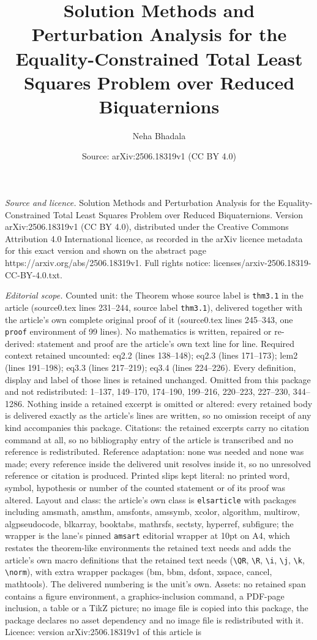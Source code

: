 \documentclass[10pt,a4paper]{amsart}
\title[Solution Methods and Perturbation Analysis for the Equality-]{Solution Methods and Perturbation Analysis for the Equality-Constrained Total Least Squares Problem over Reduced Biquaternions}
\author{Neha Bhadala}
\date{Source: arXiv:2506.18319v1 (CC BY 4.0)}
\begin{document}
\maketitle

\noindent\emph{Source and licence.} Solution Methods and Perturbation Analysis for the Equality-Constrained Total Least Squares Problem over Reduced Biquaternions. Version arXiv:2506.18319v1 (CC BY 4.0), distributed under the Creative Commons Attribution 4.0 International licence, as recorded in the arXiv licence metadata for this exact version and shown on the abstract page https://arxiv.org/abs/2506.18319v1. Full rights notice: licenses/arxiv-2506.18319-CC-BY-4.0.txt.\par\smallskip

\noindent\textit{Editorial scope.} Counted unit: the Theorem whose source label is \texttt{thm3.1} in the article (source0.tex lines 231--244, source label \texttt{thm3.1}), delivered together with the article's own complete original proof of it (source0.tex lines 245--343, one \texttt{proof} environment of 99 lines). No mathematics is written, repaired or re-derived: statement and proof are the article's own text line for line. Required context retained uncounted: eq2.2 (lines 138--148); eq2.3 (lines 171--173); lem2 (lines 191--198); eq3.3 (lines 217--219); eq3.4 (lines 224--226). Every definition, display and label of those lines is retained unchanged. Omitted from this package and not redistributed: 1--137, 149--170, 174--190, 199--216, 220--223, 227--230, 344--1286. Nothing inside a retained excerpt is omitted or altered: every retained body is delivered exactly as the article's lines are written, so no omission receipt of any kind accompanies this package. Citations: the retained excerpts carry no citation command at all, so no bibliography entry of the article is transcribed and no reference is redistributed. Reference adaptation: none was needed and none was made; every reference inside the delivered unit resolves inside it, so no unresolved reference or citation is produced. Printed slips kept literal: no printed word, symbol, hypothesis or number of the counted statement or of its proof was altered. Layout and class: the article's own class is \texttt{elsarticle} with packages including amsmath, amsthm, amsfonts, amssymb, xcolor, algorithm, multirow, algpseudocode, blkarray, booktabs, mathrsfs, sectsty, hyperref, subfigure; the wrapper is the lane's pinned \texttt{amsart} editorial wrapper at 10pt on A4, which restates the theorem-like environments the retained text needs and adds the article's own macro definitions that the retained text needs (\texttt{\textbackslash QR}, \texttt{\textbackslash R}, \texttt{\textbackslash i}, \texttt{\textbackslash j}, \texttt{\textbackslash k}, \texttt{\textbackslash norm}), with extra wrapper packages (bm, bbm, dsfont, xspace, cancel, mathtools). The delivered numbering is the unit's own. Assets: no retained span contains a figure environment, a graphics-inclusion command, a PDF-page inclusion, a table or a TikZ picture; no image file is copied into this package, the package declares no asset dependency and no image file is redistributed with it. Licence: version arXiv:2506.18319v1 of this article is 
\end{document}
